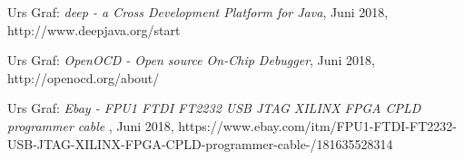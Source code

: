 \begingroup
\renewcommand{\chapter}[2]{\section#1{#2}}%
\begin{thebibliography}{99}


	Urs Graf:
	\emph{deep - a Cross Development Platform for Java},
	Juni 2018, http://www.deepjava.org/start

	Urs Graf:
	\emph{OpenOCD - Open source On-Chip Debugger},
	Juni 2018, http://openocd.org/about/

	Urs Graf:
	\emph{Ebay - FPU1 FTDI FT2232 USB JTAG XILINX FPGA CPLD programmer cable },
	Juni 2018, https://www.ebay.com/itm/FPU1-FTDI-FT2232-USB-JTAG-XILINX-FPGA-CPLD-programmer-cable-/181635528314






	\end{thebibliography}
\endgroup